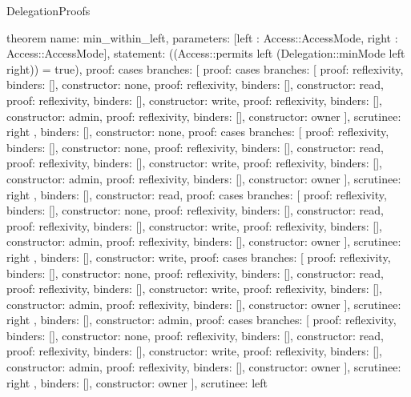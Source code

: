 \begin{lexlean}{DelegationProofs}
\begin{semanticmodule}
theorem{
  name: min_within_left,
  parameters: [left : Access::AccessMode, right : Access::AccessMode],
  statement: ((Access::permits left (Delegation::minMode left right)) = true),
  proof: cases{
    branches: [
      {proof: cases{
        branches: [
          {proof: reflexivity{}, binders: [], constructor: none},
          {proof: reflexivity{}, binders: [], constructor: read},
          {proof: reflexivity{}, binders: [], constructor: write},
          {proof: reflexivity{}, binders: [], constructor: admin},
          {proof: reflexivity{}, binders: [], constructor: owner}
        ],
        scrutinee: right
      }, binders: [], constructor: none},
      {proof: cases{
        branches: [
          {proof: reflexivity{}, binders: [], constructor: none},
          {proof: reflexivity{}, binders: [], constructor: read},
          {proof: reflexivity{}, binders: [], constructor: write},
          {proof: reflexivity{}, binders: [], constructor: admin},
          {proof: reflexivity{}, binders: [], constructor: owner}
        ],
        scrutinee: right
      }, binders: [], constructor: read},
      {proof: cases{
        branches: [
          {proof: reflexivity{}, binders: [], constructor: none},
          {proof: reflexivity{}, binders: [], constructor: read},
          {proof: reflexivity{}, binders: [], constructor: write},
          {proof: reflexivity{}, binders: [], constructor: admin},
          {proof: reflexivity{}, binders: [], constructor: owner}
        ],
        scrutinee: right
      }, binders: [], constructor: write},
      {proof: cases{
        branches: [
          {proof: reflexivity{}, binders: [], constructor: none},
          {proof: reflexivity{}, binders: [], constructor: read},
          {proof: reflexivity{}, binders: [], constructor: write},
          {proof: reflexivity{}, binders: [], constructor: admin},
          {proof: reflexivity{}, binders: [], constructor: owner}
        ],
        scrutinee: right
      }, binders: [], constructor: admin},
      {proof: cases{
        branches: [
          {proof: reflexivity{}, binders: [], constructor: none},
          {proof: reflexivity{}, binders: [], constructor: read},
          {proof: reflexivity{}, binders: [], constructor: write},
          {proof: reflexivity{}, binders: [], constructor: admin},
          {proof: reflexivity{}, binders: [], constructor: owner}
        ],
        scrutinee: right
      }, binders: [], constructor: owner}
    ],
    scrutinee: left
  }
}


\end{semanticmodule}
\end{lexlean}
